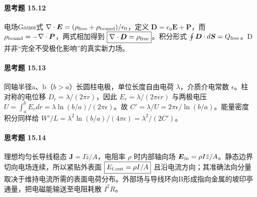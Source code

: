 \paragraph{思考题 15.12}
电场Gauss式 \(\nabla\cdot\boldsymbol E=(\rho_{\rm free}+\rho_{\rm bound})/\epsilon_0\)，定义 \(\boldsymbol D=\epsilon_0\boldsymbol E+\boldsymbol P\)，而 \(\rho_{\rm bound}=-\nabla\cdot\boldsymbol P\)，两式相加得到 \(\boxed{\nabla\cdot\boldsymbol D=\rho_{\rm free}}\)。积分形式 \(\oint\boldsymbol D\cdot d\boldsymbol S=Q_{\rm free}\)。D并非“完全不受极化影响”的真实新力场。

\paragraph{思考题 15.13}
同轴半径a、b（\(b>a\)）长圆柱电极，单位长度自由电荷 \(\lambda\)，介质介电常数 \(\epsilon\)。柱对称的电位移 \(D_r=\lambda/(2\pi r)\)，因此 \(E_r=\lambda/(2\pi\epsilon r)\) 与两极电压 \(U=\int_a^bE_rdr=\lambda\ln(b/a)/(2\pi\epsilon)\)。故 \(\boxed{C'=\lambda/U=2\pi\epsilon/\ln(b/a)}\)。能量密度积分同样给 \(W'/L=\lambda^2\ln(b/a)/(4\pi\epsilon)=\lambda^2/(2C')\)。

\paragraph{思考题 15.14}
理想均匀长导线稳态 \(\boldsymbol J=I\hat z/A\)，电阻率 \(\rho\) 时内部轴向场 \(\boldsymbol E_{\rm in}=\rho I\hat z/A\)。静态边界切向电场连续，所以紧贴外表面 \(\boxed{E_{t,\rm out}=\rho I/A}\) 且沿电流方向；其准确法向分量取决于维持电流所需的表面电荷分布。外部场与导线环向B形成指向金属的坡印亭通量，把电磁能输送至电阻耗散 \(I^2R\)。
